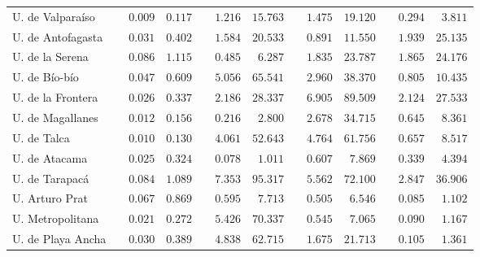 \begin{tabular}{l crr crr crr crr}
U. de Valparaíso               & & $      0.009$ & $        0.117$ & & $      1.216$ & $       15.763$ & & $      1.475$ & $       19.120$ & & $      0.294$ & $        3.811$ \\
U. de Antofagasta              & & $      0.031$ & $        0.402$ & & $      1.584$ & $       20.533$ & & $      0.891$ & $       11.550$ & & $      1.939$ & $       25.135$ \\
U. de la Serena                & & $      0.086$ & $        1.115$ & & $      0.485$ & $        6.287$ & & $      1.835$ & $       23.787$ & & $      1.865$ & $       24.176$ \\
U. de Bío-bío                  & & $      0.047$ & $        0.609$ & & $      5.056$ & $       65.541$ & & $      2.960$ & $       38.370$ & & $      0.805$ & $       10.435$ \\
U. de la Frontera              & & $      0.026$ & $        0.337$ & & $      2.186$ & $       28.337$ & & $      6.905$ & $       89.509$ & & $      2.124$ & $       27.533$ \\
U. de Magallanes               & & $      0.012$ & $        0.156$ & & $      0.216$ & $        2.800$ & & $      2.678$ & $       34.715$ & & $      0.645$ & $        8.361$ \\
U. de Talca                    & & $      0.010$ & $        0.130$ & & $      4.061$ & $       52.643$ & & $      4.764$ & $       61.756$ & & $      0.657$ & $        8.517$ \\
U. de Atacama                  & & $      0.025$ & $        0.324$ & & $      0.078$ & $        1.011$ & & $      0.607$ & $        7.869$ & & $      0.339$ & $        4.394$ \\
U. de Tarapacá                 & & $      0.084$ & $        1.089$ & & $      7.353$ & $       95.317$ & & $      5.562$ & $       72.100$ & & $      2.847$ & $       36.906$ \\
U. Arturo Prat                 & & $      0.067$ & $        0.869$ & & $      0.595$ & $        7.713$ & & $      0.505$ & $        6.546$ & & $      0.085$ & $        1.102$ \\
U. Metropolitana               & & $      0.021$ & $        0.272$ & & $      5.426$ & $       70.337$ & & $      0.545$ & $        7.065$ & & $      0.090$ & $        1.167$ \\
U. de Playa Ancha              & & $      0.030$ & $        0.389$ & & $      4.838$ & $       62.715$ & & $      1.675$ & $       21.713$ & & $      0.105$ & $        1.361$ \\

\end{tabular}
